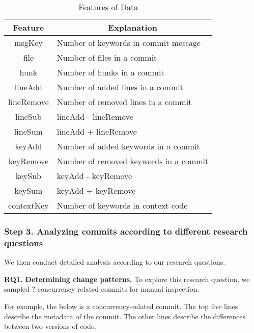 



\begin{table}
	\centering
	\caption{Features of Data}
	\label{table:feature}
	\begin{tabular}{|c|l|}\hline
		Feature&\multicolumn{1}{|c|}{Explanation}\\\hline
		msgKey&Number of keywords in commit message\\
		file&Number of files in a commit\\
		hunk&Number of hunks in a commit\\
		lineAdd&Number of added lines in a commit\\
		lineRemove&Number of removed lines in a commit\\
		lineSub&lineAdd - lineRemove\\
		lineSum&lineAdd + lineRemove\\
		keyAdd&Number of added keywords in a commit\\
		keyRemove&Number of removed keywords in a commit\\
		keySub&keyAdd - keyRemove\\
		keySum&keyAdd + keyRemove\\
		contextKey&Number of keywords in context code\\\hline
	\end{tabular}
\end{table}

\subsubsection{Step 3. Analyzing commits according to different research questions} We then conduct detailed analysis according to our research questions.


\textbf{RQ1. Determining change patterns.} To explore this research question, we sampled ? concurrency-related commits for manual inspection. 

For example, the below is a concurrency-related commit. The top five lines describe the metadata of the commit. The other lines describe the differences between two versions of code.

